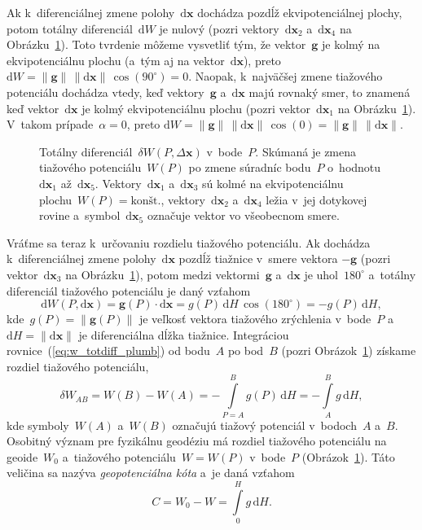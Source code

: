 \documentclass[a4paper,12pt]{book}
\newcommand{\diff}{\mathrm d}
\let\vec\mathbf
\begin{document}
Ak k~diferenciálnej zmene polohy~$\diff \vec x$ dochádza pozdĺž 
ekvipotenciálnej plochy, potom totálny diferenciál~$\diff W$ je nulový (pozri 
vektory~$\diff \vec x_2$ a~$\diff \vec x_4$ na 
Obrázku~\ref{fig:total_differential}).  Toto tvrdenie môžeme vysvetliť tým, že 
vektor~$\vec g$ je kolmý na ekvipotenciálnu plochu (a~tým aj na vektor~$\diff 
\vec x$), preto $\diff W = \| \vec g \| \, \| \diff \vec x \| \, 
\cos(90^{\circ}) = 0$.  Naopak, k~najväčšej zmene tiažového potenciálu dochádza 
vtedy, keď vektory~$\vec g$ a~$\diff \vec x$ majú rovnaký smer, to znamená keď 
vektor~$\diff \vec x$ je kolmý ekvipotenciálnu plochu (pozri vektor~$\diff \vec 
x_1$ na Obrázku~\ref{fig:total_differential}).  V~takom prípade~$\alpha = 0$, 
preto $\diff W = \| \vec g \| \, \| \diff \vec x \| \, \cos(0) = \| \vec g \| 
\, \| \diff \vec x \|$.

\begin{figure}
\centering

\caption{Totálny diferenciál~$\delta W(P, \Delta \vec x)$ v~bode~$P$.  Skúmaná 
je zmena tiažového potenciálu~$W(P)$ po zmene súradníc bodu~$P$ o~hodnotu 
$\diff \vec x_1$ až~$\diff \vec x_5$.  Vektory~$\diff \vec x_1$ a~$\diff \vec 
x_3$ sú kolmé na ekvipotenciálnu plochu~$W(P) = \textrm{kon\v{s}t.}$, 
vektory~$\diff \vec x_2$ a~$\diff \vec x_4$ ležia v~jej dotykovej rovine 
a~symbol~$\diff \vec x_5$ označuje vektor vo všeobecnom smere.}
\label{fig:total_differential}
\end{figure}

Vráťme sa teraz k~určovaniu rozdielu tiažového potenciálu.  Ak dochádza 
k~diferenciálnej zmene polohy~$\diff \vec x$ pozdĺž tiažnice v~smere vektora 
$-\vec g$ (pozri vektor~$\diff \vec x_3$ na 
Obrázku~\ref{fig:total_differential}), potom medzi vektormi~$\vec g$ a~$\diff 
\vec x$ je uhol~$180^{\circ}$ a~totálny diferenciál tiažového potenciálu je 
daný vzťahom
%
\begin{equation}
\label{eq:w_totdiff_plumb}
\diff W(P, \diff \vec x) = \vec g(P) \cdot \diff \vec x = g(P) \, \diff H \, 
\cos(180^{\circ}) = -g(P) \, \diff H{,}
\end{equation}
%
kde~$g(P) = \| \vec g(P) \|$ je veľkosť vektora tiažového zrýchlenia v~bode~$P$ 
a~$\diff H = \| \diff \vec x \|$ je diferenciálna dĺžka tiažnice.  Integráciou 
rovnice~(\ref{eq:w_totdiff_plumb}) od bodu~$A$ po bod~$B$ (pozri 
Obrázok~\ref{fig:total_differential}) získame rozdiel tiažového potenciálu,
%
\begin{equation}
\label{eq:w_ab}
\delta W_{AB} = W(B) - W(A) = -\int\limits_{P = A}^{B} g(P) \, \diff 
H = -\int\limits_{A}^{B} g \, \diff H{,}
\end{equation}
%
kde symboly~$W(A)$ a~$W(B)$ označujú tiažový potenciál v~bodoch~$A$ a~$B$.  
Osobitný význam pre fyzikálnu geodéziu má rozdiel tiažového potenciálu na 
geoide~$W_0$ a~tiažového potenciálu~$W = W(P)$ v~bode~$P$ 
(Obrázok~\ref{fig:total_differential}).  Táto veličina sa nazýva 
\emph{geopotenciálna kóta} a~je daná vzťahom
%
\begin{equation}
\label{eq:geopotential_number}
C = W_0 - W = \int\limits_0^H g \, \diff H{.}
\end{equation}
\end{document}
